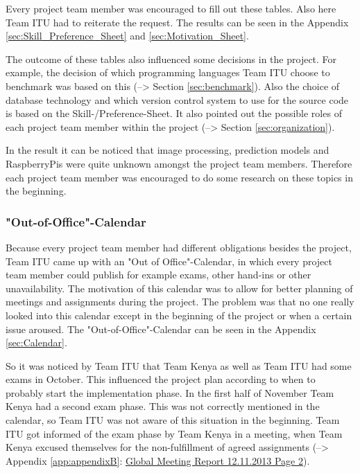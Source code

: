 Every project team member was encouraged to fill out these tables. Also here Team ITU had to reiterate the request. The results can be seen in the Appendix \ref{sec:Skill_Preference_Sheet} and \ref{sec:Motivation_Sheet}.

The outcome of these tables also influenced some decisions in the project. For example, the decision of which programming languages Team ITU choose to benchmark was based on this (--> Section \ref{sec:benchmark}). Also the choice of database technology and which version control system to use for the source code is based on the Skill-/Preference-Sheet. It also pointed out the possible roles of each project team member within the project (--> Section \ref{sec:organization}).

In the result it can be noticed that image processing, prediction models and RaspberryPis were quite unknown amongst the project team members. Therefore each project team member was encouraged to do some research on these topics in the beginning.


\subsubsection{"Out-of-Office"-Calendar}
Because every project team member had different obligations besides the project, Team ITU came up with an "Out of Office"-Calendar, in which every project team member could publish for example exams, other hand-ins or other unavailability. The motivation of this calendar was to allow for better planning of meetings and assignments during the project. The problem was that no one really looked into this calendar except in the beginning of the project or when a certain issue aroused. The "Out-of-Office"-Calendar can be seen in the Appendix \ref{sec:Calendar}.

So it was noticed by Team ITU that Team Kenya as well as Team ITU had some exams in October. This influenced the project plan according to when to probably start the implementation phase. In the first half of November Team Kenya had a second exam phase. This was not correctly mentioned in the calendar, so Team ITU was not aware of this situation in the beginning. Team ITU got informed of the exam phase by Team Kenya in a meeting, when Team Kenya excused themselves for the non-fulfillment of agreed assignments (--> Appendix \ref{app:appendixB}: \hyperlink{GSD20131112.2}{Global Meeting Report 12.11.2013 Page 2}).

